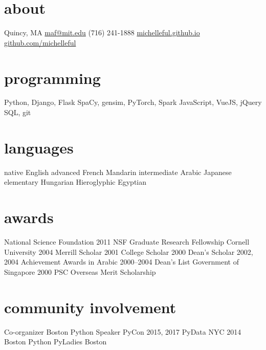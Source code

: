 \documentclass[]{friggeri-cv}
\begin{document}


\begin{aside}
  \section{about}
	Quincy, MA
    \href{mailto:maf@mit.edu}{maf@mit.edu}
    (716) 241-1888
    \href{http://michelleful.github.io}{michelleful.github.io}
    \href{http://github.com/michelleful}{github.com/michelleful}
  \section{programming}
    Python, Django, Flask
    SpaCy, gensim, PyTorch, Spark
    JavaScript, VueJS, jQuery
	SQL, git
  \section{languages}
	{\footnotesize{}native} English
	{\footnotesize{}advanced} French
	         Mandarin
	{\footnotesize{}intermediate} Arabic
	         Japanese
	{\footnotesize{}elementary} Hungarian
	           Hieroglyphic Egyptian
  \section{awards}
    {\footnotesize{}National Science Foundation}
    {\footnotesize{}2011} NSF Graduate Research Fellowship
    {\footnotesize{}Cornell University} 
    {\footnotesize{}2004} Merrill Scholar
    {\footnotesize{}2001} College Scholar
    {\footnotesize{}2000} Dean's Scholar
    {\footnotesize{}2002, 2004} Achievement Awards in Arabic
    {\footnotesize{}2000--2004} Dean's List
    {\footnotesize{}Government of Singapore}
    {\footnotesize{}2000} PSC Overseas Merit Scholarship 
  \section{community involvement}
    {\footnotesize{}Co-organizer}
    Boston Python
    {\footnotesize{}Speaker}
	PyCon 2015, 2017
	PyData NYC 2014
    Boston Python
    PyLadies Boston
\end{aside}
\end{document}
